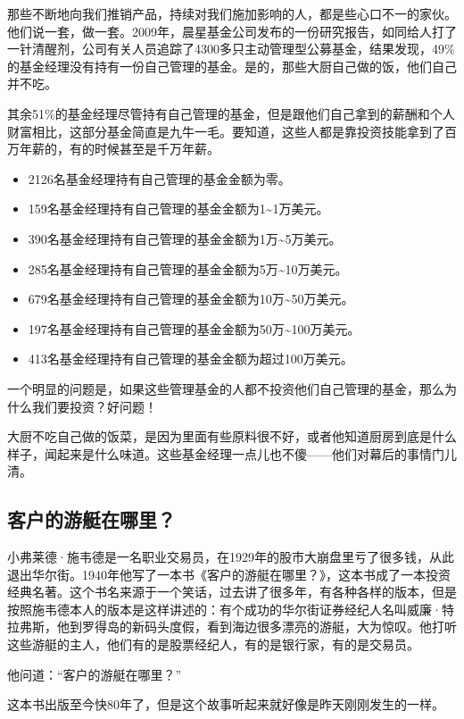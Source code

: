 那些不断地向我们推销产品，持续对我们施加影响的人，都是些心口不一的家伙。他们说一套，做一套。2009年，晨星基金公司发布的一份研究报告，如同给人打了一针清醒剂，公司有关人员追踪了4300多只主动管理型公募基金，结果发现，49\%的基金经理没有持有一份自己管理的基金。是的，那些大厨自己做的饭，他们自己并不吃。

其余51\%的基金经理尽管持有自己管理的基金，但是跟他们自己拿到的薪酬和个人财富相比，这部分基金简直是九牛一毛。要知道，这些人都是靠投资技能拿到了百万年薪的，有的时候甚至是千万年薪。

\begin{itemize}
\item 2126名基金经理持有自己管理的基金金额为零。
\item 159名基金经理持有自己管理的基金金额为1\textasciitilde{}1万美元。
\item 390名基金经理持有自己管理的基金金额为1万\textasciitilde{}5万美元。
\item 285名基金经理持有自己管理的基金金额为5万\textasciitilde{}10万美元。
\item 679名基金经理持有自己管理的基金金额为10万\textasciitilde{}50万美元。
\item 197名基金经理持有自己管理的基金金额为50万\textasciitilde{}100万美元。
\item 413名基金经理持有自己管理的基金金额为超过100万美元。
\end{itemize}

一个明显的问题是，如果这些管理基金的人都不投资他们自己管理的基金，那么为什么我们要投资？好问题！

大厨不吃自己做的饭菜，是因为里面有些原料很不好，或者他知道厨房到底是什么样子，闻起来是什么味道。这些基金经理一点儿也不傻——他们对幕后的事情门儿清。

\subsection{客户的游艇在哪里？}

小弗莱德·施韦德是一名职业交易员，在1929年的股市大崩盘里亏了很多钱，从此退出华尔街。1940年他写了一本书《客户的游艇在哪里？》，这本书成了一本投资经典名著。这个书名来源于一个笑话，过去讲了很多年，有各种各样的版本，但是按照施韦德本人的版本是这样讲述的：有个成功的华尔街证券经纪人名叫威廉·特拉弗斯，他到罗得岛的新码头度假，看到海边很多漂亮的游艇，大为惊叹。他打听这些游艇的主人，他们有的是股票经纪人，有的是银行家，有的是交易员。

他问道：“客户的游艇在哪里？”

这本书出版至今快80年了，但是这个故事听起来就好像是昨天刚刚发生的一样。

